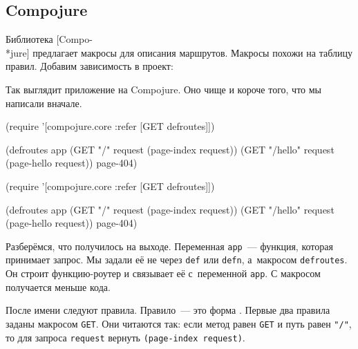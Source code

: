 \subsection{Compojure}

\label{compojure}


Библиотека [Compo-\\*jure]
предлагает макросы для описания маршрутов. Макросы похожи на таблицу правил.
Добавим зависимость в проект:

\begin{english}
  \begin{clojure}
[compojure "1.6.1"]
  \end{clojure}
\end{english}

Так выглядит приложение на Compojure. Оно чище и короче того, что мы написали
вначале.

\ifx\devicetype\mobile

\begin{english}
  \begin{clojure}
(require '[compojure.core
           :refer [GET defroutes]])

(defroutes app
  (GET "/" request
    (page-index request))
  (GET "/hello" request
    (page-hello request))
  page-404)
  \end{clojure}
\end{english}

\else

\begin{english}
  \begin{clojure}
(require '[compojure.core :refer [GET defroutes]])

(defroutes app
  (GET "/"      request (page-index request))
  (GET "/hello" request (page-hello request))
  page-404)
  \end{clojure}
\end{english}

\fi

Разберёмся, что получилось на выходе. Переменная \verb|app|~--- функция, которая
принимает запрос. Мы задали её не через \verb|def| или \verb|defn|, а~макросом
\verb|defroutes|. Он строит функцию-роутер и связывает её с~переменной
\verb|app|. С макросом получается меньше кода.

После имени следуют правила. Правило~--- это форма .
Первые два правила заданы макросом \verb|GET|. Они читаются так:
если метод равен \verb|GET| и путь равен \verb|"/"|, то для запроса
\verb|request| вернуть \verb|(page-index request)|.


